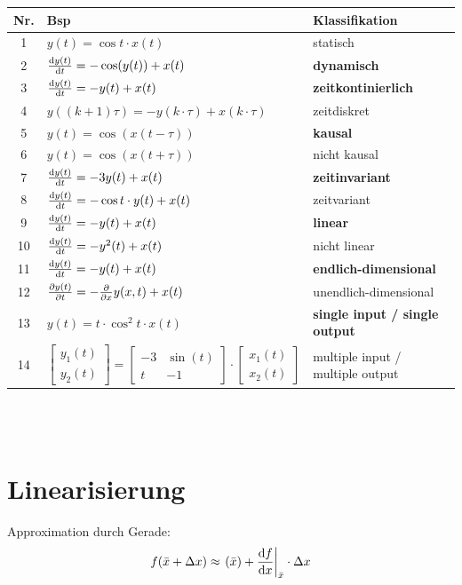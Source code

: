 \begin{tabular}{c|l|l}
 Nr. & Bsp & Klassifikation \\ 
\hline 1 & $y(t) = \cos t \cdot x(t)$ & statisch \\ 
	   2 & $\frac{\mathrm{d} y(t)}{\mathrm{d} t} = - \cos (y(t)) + x(t)$ & \textbf{dynamisch} \\ 
\hline 3 & $\frac{\mathrm{d} y(t)}{\mathrm{d} t} = -y(t) + x(t)$ & \textbf{zeitkontinierlich} \\ 
	   4 & $y((k+1)\tau)=-y(k\cdot \tau) + x(k \cdot \tau)$ & zeitdiskret \\ 
\hline 5 & $y(t) = \cos (x (t-\tau))$ & \textbf{kausal} \\ 
 	   6 & $y(t) = \cos(x(t+\tau))$ & nicht kausal \\ 
\hline 7 & $\frac{\mathrm{d} y(t)}{\mathrm{d} t} = -3y(t) + x(t)$ & \textbf{zeitinvariant} \\ 
	   8 & $\frac{\mathrm{d} y(t)}{\mathrm{d} t} = -\cos t \cdot y(t) +x(t)$ & zeitvariant \\ 
\hline 9 & $\frac{\mathrm{d} y(t)}{\mathrm{d} t} = -y(t) +x(t)$ & \textbf{linear} \\ 
	   10 & $\frac{\mathrm{d} y(t)}{\mathrm{d} t} = -y^2(t) +x(t)$ & nicht linear \\ 
\hline 11 & $\frac{\mathrm{d} y(t)}{\mathrm{d} t} = -y(t) +x(t)$ & \textbf{endlich-dimensional} \\ 
	   12 & $\frac{\partial y(t)}{\partial t} = - \frac{\partial }{\partial x}y(x,t)+x(t)$ & unendlich-dimensional \\ 
\hline 13 & $y(t) = t \cdot \cos^2 t \cdot x(t)$ & \textbf{single input / single output} \\ 
	   14 & $\left[ \begin{matrix} y_1(t) \\ y_2(t) \end{matrix}\right] = \left[ \begin{matrix} -3 & \sin(t) \\ t & -1\end{matrix}\right] \cdot \left[ \begin{matrix} x_1(t)\\ x_2(t) \end{matrix}\right]$ & multiple input / multiple output \\ 
\end{tabular} 
\\\\

\section{Linearisierung}
Approximation durch Gerade:
\[
	f(\bar{x}+\Delta x) \approx \left.(\bar{x})+\frac{\mathrm{d} f}{\mathrm{d} x}\right|_{\bar{x}}\cdot \Delta x
\]


